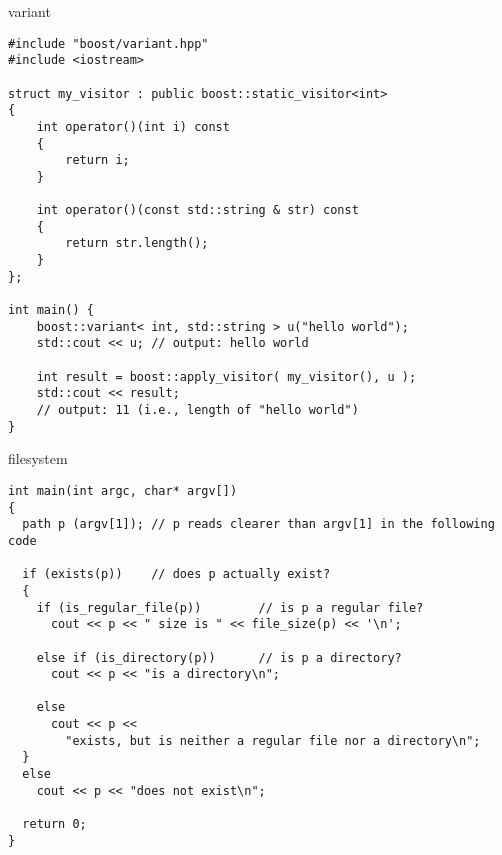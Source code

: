 \documentclass{beamer}
\begin{document}
\begin{frame}[fragile]{variant}
\small
\begin{lstlisting}
#include "boost/variant.hpp"
#include <iostream>

struct my_visitor : public boost::static_visitor<int>
{
    int operator()(int i) const
    {
        return i;
    }
    
    int operator()(const std::string & str) const
    {
        return str.length();
    }
};

int main() {
    boost::variant< int, std::string > u("hello world");
    std::cout << u; // output: hello world

    int result = boost::apply_visitor( my_visitor(), u );
    std::cout << result; 
    // output: 11 (i.e., length of "hello world")
}
\end{lstlisting}
\end{frame}

\begin{frame}[fragile]{filesystem}
\begin{lstlisting}
int main(int argc, char* argv[])
{
  path p (argv[1]); // p reads clearer than argv[1] in the following code

  if (exists(p))    // does p actually exist?
  {
    if (is_regular_file(p))        // is p a regular file?   
      cout << p << " size is " << file_size(p) << '\n';

    else if (is_directory(p))      // is p a directory?
      cout << p << "is a directory\n";

    else
      cout << p << 
        "exists, but is neither a regular file nor a directory\n";
  }
  else
    cout << p << "does not exist\n";

  return 0;
}
\end{lstlisting}
\end{frame}
\end{document}
